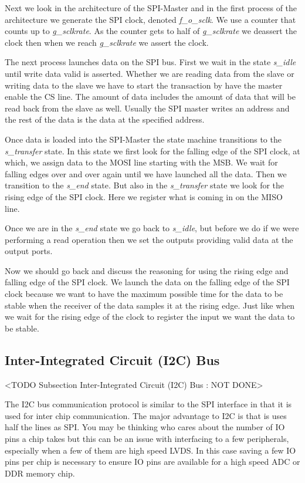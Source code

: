 Next we look in the architecture of the \ac{SPI}-Master and in the first process of the architecture we generate the \ac{SPI} clock, denoted \emph{f\_o\_sclk}. We use a counter that counts up to \emph{g\_sclkrate}. As the counter gets to half of \emph{g\_sclkrate} we deassert the clock then when we reach \emph{g\_sclkrate} we assert the clock. 

The next process launches data on the \ac{SPI} bus. First we wait in the state \emph{s\_idle} until write data valid is asserted. Whether we are reading data from the slave or writing data to the slave we have to start the transaction by have the master enable the \ac{CS} line. The amount of data includes the amount of data that will be read back from the slave as well. Usually the \ac{SPI} master writes an address and the rest of the data is the data at the specified address.

Once data is loaded into the \ac{SPI}-Master the state machine transitions to the \emph{s\_transfer} state. In this state we first look for the falling edge of the \ac{SPI} clock, at which, we assign data to the \ac{MOSI} line starting with the \ac{MSB}. We wait for falling edges over and over again until we have launched all the data. Then we transition to the \emph{s\_end} state. But also in the \emph{s\_transfer} state we look for the rising edge of the \ac{SPI} clock. Here we register what is coming in on the \ac{MISO} line. 

Once we are in the \emph{s\_end} state we go back to \emph{s\_idle}, but before we do if we were performing a read operation then we set the outputs providing valid data at the output ports. 

Now we should go back and discuss the reasoning for using the rising edge and falling edge of the \ac{SPI} clock. We launch the data on the falling edge of the \ac{SPI} clock because we want to have the maximum possible time for the data to be stable when the receiver of the data samples it at the rising edge. Just like when we wait for the rising edge of the clock to register the input we want the data to be stable. 

\subsection{Inter-Integrated Circuit (I2C) Bus}
	<TODO Subsection Inter-Integrated Circuit (I2C) Bus : NOT DONE>

The \ac{I2C} bus communication protocol is similar to the \ac{SPI} interface in that it is used for inter chip communication. The major advantage to \ac{I2C} is that is uses half the lines as \ac{SPI}. You may be thinking who cares about the number of \ac{IO} pins a chip takes but this can be an issue with interfacing to a few peripherals, especially when a few of them are high speed \ac{LVDS}. In this case saving a few \ac{IO} pins per chip is necessary to ensure \ac{IO} pins are available for a high speed \ac{ADC} or \ac{DDR} memory chip. 	
	
